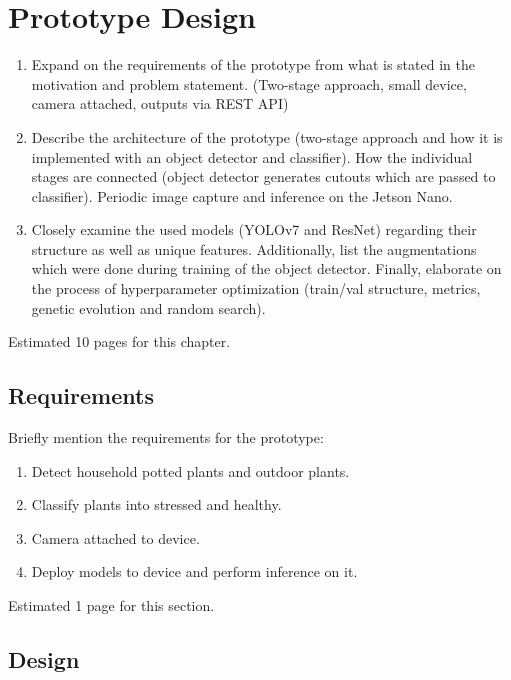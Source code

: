\documentclass[draft,final]{vutinfth} %
\begin{document}
\chapter{Prototype Design}
\label{chap:design}

\begin{enumerate}
\item Expand on the requirements of the prototype from what is stated
  in the motivation and problem statement. (Two-stage approach, small
  device, camera attached, outputs via REST API)
\item Describe the architecture of the prototype (two-stage approach
  and how it is implemented with an object detector and
  classifier). How the individual stages are connected (object
  detector generates cutouts which are passed to classifier). Periodic
  image capture and inference on the Jetson Nano.
\item Closely examine the used models (YOLOv7 and ResNet) regarding
  their structure as well as unique features. Additionally, list the
  augmentations which were done during training of the object
  detector. Finally, elaborate on the process of hyperparameter
  optimization (train/val structure, metrics, genetic evolution and
  random search).
\end{enumerate}

Estimated 10 pages for this chapter.

\section{Requirements}
\label{sec:requirements}

Briefly mention the requirements for the prototype:

\begin{enumerate}
\item Detect household potted plants and outdoor plants.
\item Classify plants into stressed and healthy.
\item Camera attached to device.
\item Deploy models to device and perform inference on it.
\end{enumerate}

Estimated 1 page for this section.

\section{Design}
\label{sec:design}
\end{document}
